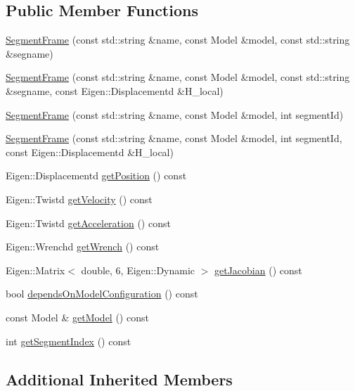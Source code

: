 \subsection*{Public Member Functions}
\begin{DoxyCompactItemize}
\item 
\hyperlink{classocra_1_1SegmentFrame_ab05987e2ecc0f904c905b9e66269ce84}{Segment\+Frame} (const std\+::string \&name, const Model \&model, const std\+::string \&segname)
\item 
\hyperlink{classocra_1_1SegmentFrame_ad9cd47c330239c77e913d38029af808d}{Segment\+Frame} (const std\+::string \&name, const Model \&model, const std\+::string \&segname, const Eigen\+::\+Displacementd \&H\+\_\+local)
\item 
\hyperlink{classocra_1_1SegmentFrame_a01156da94eca5bf4961077a3310fc271}{Segment\+Frame} (const std\+::string \&name, const Model \&model, int segment\+Id)
\item 
\hyperlink{classocra_1_1SegmentFrame_a3864bc8263c40f7afa11de3c8c2dd76b}{Segment\+Frame} (const std\+::string \&name, const Model \&model, int segment\+Id, const Eigen\+::\+Displacementd \&H\+\_\+local)
\item 
Eigen\+::\+Displacementd \hyperlink{classocra_1_1SegmentFrame_ad0c5aa3b15b384cd5a4774ddd534b32e}{get\+Position} () const
\item 
Eigen\+::\+Twistd \hyperlink{classocra_1_1SegmentFrame_a6a45d4901408704ead9bbd1f5b99a666}{get\+Velocity} () const
\item 
Eigen\+::\+Twistd \hyperlink{classocra_1_1SegmentFrame_aa8f7f9544b59da591d94ac8e6a8a9e5d}{get\+Acceleration} () const
\item 
Eigen\+::\+Wrenchd \hyperlink{classocra_1_1SegmentFrame_a47bebcb9817083395ab034fe8fb72a19}{get\+Wrench} () const
\item 
Eigen\+::\+Matrix$<$ double, 6, Eigen\+::\+Dynamic $>$ \hyperlink{classocra_1_1SegmentFrame_a1ece38dd51a3331dfe3de7911ad9291e}{get\+Jacobian} () const
\item 
bool \hyperlink{classocra_1_1SegmentFrame_a68708b5ced24d192fbb0bfd9e3647925}{depends\+On\+Model\+Configuration} () const
\item 
const Model \& \hyperlink{classocra_1_1SegmentFrame_a3a14b77753ad98507db9968b33c582e4}{get\+Model} () const
\item 
int \hyperlink{classocra_1_1SegmentFrame_a8f651dccb13afc25504531efd17c8eef}{get\+Segment\+Index} () const
\end{DoxyCompactItemize}
\subsection*{Additional Inherited Members}


